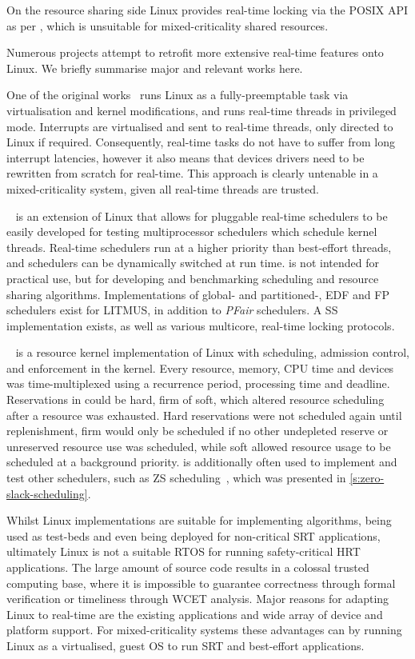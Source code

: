 On the resource sharing side Linux provides real-time locking via the \gls{POSIX} API as per
, which is unsuitable for mixed-criticality shared resources.

Numerous projects attempt to retrofit more extensive real-time features onto
Linux.  We briefly summarise major and relevant works here. 

One of the original
works~\citep{Yodaiken_Barabanov_97} runs Linux as a fully-preemptable task via virtualisation and
kernel modifications, and runs real-time threads in privileged mode. Interrupts are virtualised and
sent to real-time threads, only directed to
Linux if required. Consequently, real-time tasks do not have to suffer from long interrupt
latencies, however it also means that devices drivers need to be rewritten from scratch for
real-time. This approach is clearly untenable in a mixed-criticality system, given all real-time
threads are trusted. 

\litmus~\citep{Calandrino_LBDA_07} is an extension of Linux that allows for pluggable real-time
schedulers to be easily developed for testing multiprocessor schedulers which schedule kernel
threads. Real-time schedulers run at a higher priority than best-effort threads, and schedulers can
be dynamically switched at run time. \litmus is not intended for
practical use, but for developing and benchmarking scheduling and resource sharing algorithms.
Implementations of global- and partitioned-, EDF and FP schedulers exist for LITMUS, in addition to
\emph{PFair} schedulers. A \gls{SS} implementation exists, as well as various multicore,
real-time locking protocols.

\linuxrk~\citep{Oikawa_Rajkumar_98} is a resource kernel implementation of Linux with scheduling,
admission control, and enforcement in the kernel. Every resource, memory, CPU time and devices was
time-multiplexed using a recurrence period, processing time and deadline. Reservations in \linuxrk
could be hard, firm of soft, which altered resource scheduling after a resource was exhausted. Hard
reservations were not scheduled again until replenishment, firm would only be scheduled if no other
undepleted reserve or unreserved resource use was scheduled, while soft allowed resource usage to be
scheduled at a background priority. \linuxrk is additionally often used to implement and test other
schedulers, such as \Gls{ZS} scheduling~\citep{deNiz_LR_09}, which was presented in
\cref{s:zero-slack-scheduling}.
 
Whilst Linux implementations are suitable for implementing algorithms, being used as test-beds and
even being deployed for non-critical \gls{SRT} applications, ultimately Linux is not a suitable
\gls{RTOS} for running safety-critical \gls{HRT} applications. The large amount of source code
results in a colossal trusted computing base, where it is impossible to guarantee correctness through
formal verification or timeliness through {\gls{WCET}} analysis.  Major reasons for adapting Linux
to real-time are the existing applications and wide array of device and platform support. For
mixed-criticality systems these advantages can by running Linux as a virtualised, guest \gls{OS} to run \gls{SRT}
and best-effort applications.

